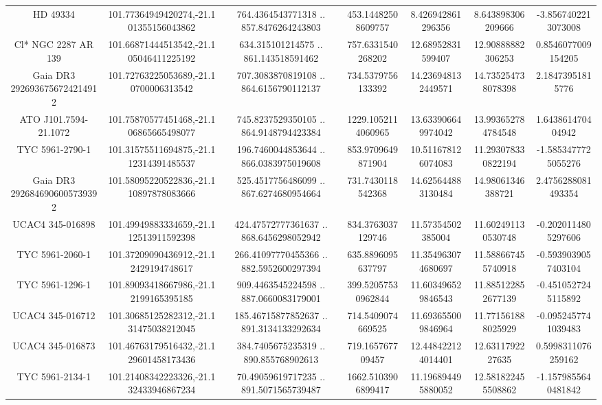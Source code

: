 \begin{table}
\begin{tabular}{ccccccc}
HD  49334 & 101.77364949420274,-21.101355156043862 & 764.4364543771318 .. 857.8476264243803 & 453.14482508609757 & 8.426942861296356 & 8.643898306209666 & -3.8567402213073008 \\
Cl* NGC 2287     AR     139 & 101.66871444513542,-21.105046411225192 & 634.315101214575 .. 861.143518591462 & 757.6331540268202 & 12.68952831599407 & 12.90888882306253 & 0.8546077009154205 \\
Gaia DR3 2926936756724214912 & 101.72763225053689,-21.10700006313542 & 707.3083870819108 .. 864.6156790112137 & 734.5379756133392 & 14.236948132449571 & 14.735254738078398 & 2.18473951815776 \\
ATO J101.7594-21.1072 & 101.75870577451468,-21.106865665498077 & 745.8237529350105 .. 864.9148794423384 & 1229.1052114060965 & 13.633906649974042 & 13.993652784784548 & 1.643861470404942 \\
TYC 5961-2790-1 & 101.31575511694875,-21.112314391485537 & 196.7460044853644 .. 866.0383975019608 & 853.9709649871904 & 10.511678126074083 & 11.293078330822194 & -1.5853477725055276 \\
Gaia DR3 2926846906005739392 & 101.58095220522836,-21.110897878083666 & 525.4517756486099 .. 867.6274680954664 & 731.7430118542368 & 14.625644883130484 & 14.98061346388721 & 2.4756288081493354 \\
UCAC4 345-016898 & 101.49949883334659,-21.112513911592398 & 424.47572777361637 .. 868.6456298052942 & 834.3763037129746 & 11.57354502385004 & 11.602491130530748 & -0.2020114805297606 \\
TYC 5961-2060-1 & 101.37209090436912,-21.12429194748617 & 266.41097770455366 .. 882.5952600297394 & 635.8896095637797 & 11.354963074680697 & 11.588667455740918 & -0.5939039057403104 \\
TYC 5961-1296-1 & 101.89093418667986,-21.12199165395185 & 909.4463545224598 .. 887.0660083179001 & 399.52057530962844 & 11.603496529846543 & 11.885122852677139 & -0.4510527245115892 \\
UCAC4 345-016712 & 101.30685125282312,-21.131475038212045 & 185.46715877852637 .. 891.3134133292634 & 714.5409074669525 & 11.693655009846964 & 11.771561888025929 & -0.0952457741039483 \\
UCAC4 345-016873 & 101.46763179516432,-21.129601458173436 & 384.7405675235319 .. 890.855768902613 & 719.165767709457 & 12.448422124014401 & 12.6311792227635 & 0.5998311076259162 \\
TYC 5961-2134-1 & 101.21408342223326,-21.132433946867234 & 70.49059619717235 .. 891.5071565739487 & 1662.5103906899417 & 11.196894495880052 & 12.581822455508862 & -1.1579855640481842 \\

\end{tabular}
\end{table}
